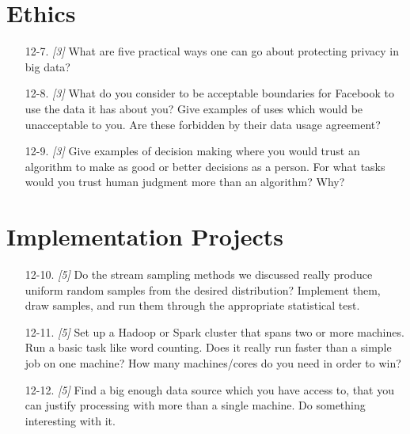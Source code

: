 \documentclass[10pt]{article}
\begin{document}
\begin{enumerate}
\section*{Ethics}
\begin{enumerate}
  \item[12-7.] \textit{[3]} What are five practical ways one can go about protecting privacy in big data?
  \item[12-8.] \textit{[3]} What do you consider to be acceptable boundaries for Facebook to use the data it has about you? Give examples of uses which would be unacceptable to you. Are these forbidden by their data usage agreement?
  \item[12-9.] \textit{[3]} Give examples of decision making where you would trust an algorithm to make as good or better decisions as a person. For what tasks would you trust human judgment more than an algorithm? Why?
\end{enumerate}

\section*{Implementation Projects}
\begin{enumerate}
  \item[12-10.] \textit{[5]} Do the stream sampling methods we discussed really produce uniform random samples from the desired distribution? Implement them, draw samples, and run them through the appropriate statistical test.
  \item[12-11.] \textit{[5]} Set up a Hadoop or Spark cluster that spans two or more machines. Run a basic task like word counting. Does it really run faster than a simple job on one machine? How many machines/cores do you need in order to win?
  \item[12-12.] \textit{[5]} Find a big enough data source which you have access to, that you can justify processing with more than a single machine. Do something interesting with it.
\end{enumerate}


\end{enumerate}
\end{document}
